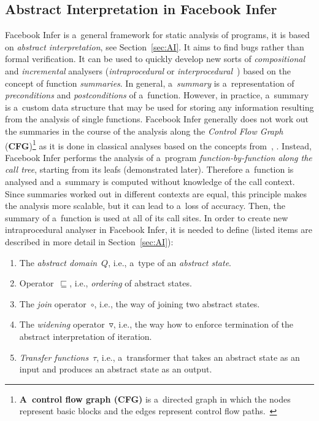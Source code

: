 \subsection{Abstract Interpretation in Facebook Infer}
\label{sec:fbinferAI}

Facebook Infer is a~general framework for static analysis of programs, it is
based on \emph{abstract interpretation}, see Section~\ref{sec:AI}. It aims
to find bugs rather than formal verification. It can be used to quickly develop
new sorts of \emph{compositional} and \emph{incremental} analysers
(\emph{intraprocedural} or
\emph{interprocedural}~\cite{programAnalysisNielson}) based
on the concept of function \emph{summaries}. In general, a~\emph{summary}
is a~representation of \emph{preconditions} and \emph{postconditions} of
a~function. However, in practice, a~summary is a~custom data structure that
may be used for storing any information resulting from the analysis of
single functions. Facebook Infer generally does not work out the summaries
in the course of the analysis along the \emph{Control Flow Graph}
(\textbf{CFG})\footnote{\textbf{A~control flow graph (CFG)} is a~directed
graph in which the nodes represent basic blocks and the edges represent control
flow paths.~\cite{controlFlowAnalysisAllen}} as it is done in classical
analyses based on the concepts from~\cite{dataflowAnalysisGraphReachability},
\cite{dataflowAnalysisApproaches}. Instead, Facebook Infer performs the
analysis of a~program \emph{function-by-function along the call tree},
starting from its leafs (demonstrated later). Therefore a~function
is analysed and a~summary is computed without knowledge of the
call context. Since summaries worked out in different contexts are equal,
this principle makes the analysis more scalable, but it can lead to
a~loss of accuracy. Then, the summary of a~function is used at all of its
call sites. In order to create new intraprocedural analyser in Facebook
Infer, it is needed to define (listed items are described in more detail
in Section~\ref{sec:AI}):
\begin{enumerate}
    \item
        The \emph{abstract domain}~$ Q $, i.e., a~type of an
        \emph{abstract state}.

    \item
        Operator~$ \sqsubseteq $, i.e., \emph{ordering} of abstract
        states.

    \item
        The \emph{join} operator~$ \circ $, i.e., the way of joining two
        abstract states.

    \item
        The \emph{widening} operator~$ \triangledown $, i.e., the way how to
        enforce termination of the abstract interpretation of iteration.

    \item
        \emph{Transfer functions}~$ \tau $, i.e., a~transformer that
        takes an abstract state as an input and produces an abstract state
        as an output.
\end{enumerate}
